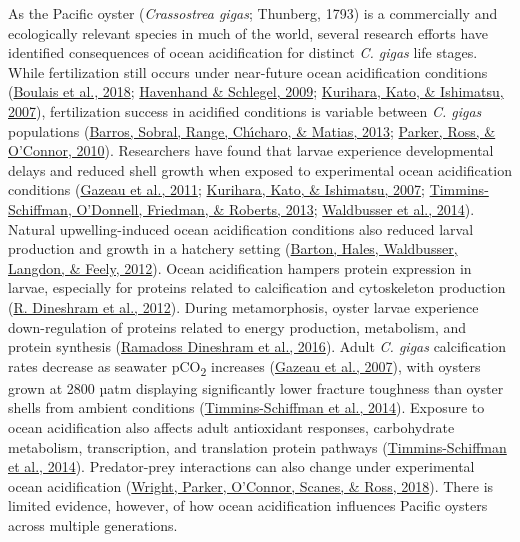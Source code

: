 \documentclass [11pt, proquest] {uwthesis}[2015/03/03]
\begin{document}
As the Pacific oyster (\emph{Crassostrea gigas}; Thunberg, 1793) is a commercially and ecologically relevant species in much of the world, several research efforts have identified consequences of ocean acidification for distinct \emph{C. gigas} life stages. While fertilization still occurs under near-future ocean acidification conditions (\protect\hyperlink{ref-Boulais2018}{Boulais et al., 2018}; \protect\hyperlink{ref-Havenhand2009}{Havenhand \& Schlegel, 2009}; \protect\hyperlink{ref-Kurihara2007}{Kurihara, Kato, \& Ishimatsu, 2007}), fertilization success in acidified conditions is variable between \emph{C. gigas} populations (\protect\hyperlink{ref-Barros2013}{Barros, Sobral, Range, Chı́charo, \& Matias, 2013}; \protect\hyperlink{ref-Parker2010}{Parker, Ross, \& O'Connor, 2010}). Researchers have found that larvae experience developmental delays and reduced shell growth when exposed to experimental ocean acidification conditions (\protect\hyperlink{ref-Gazeau2011}{Gazeau et al., 2011}; \protect\hyperlink{ref-Kurihara2007}{Kurihara, Kato, \& Ishimatsu, 2007}; \protect\hyperlink{ref-Timmins-Schiffman2013}{Timmins-Schiffman, O'Donnell, Friedman, \& Roberts, 2013}; \protect\hyperlink{ref-Waldbusser2014}{Waldbusser et al., 2014}). Natural upwelling-induced ocean acidification conditions also reduced larval production and growth in a hatchery setting (\protect\hyperlink{ref-Barton2012}{Barton, Hales, Waldbusser, Langdon, \& Feely, 2012}). Ocean acidification hampers protein expression in larvae, especially for proteins related to calcification and cytoskeleton production (\protect\hyperlink{ref-Dineshram2012}{R. Dineshram et al., 2012}). During metamorphosis, oyster larvae experience down-regulation of proteins related to energy production, metabolism, and protein synthesis (\protect\hyperlink{ref-Dineshram2016}{Ramadoss Dineshram et al., 2016}). Adult \emph{C. gigas} calcification rates decrease as seawater pCO\textsubscript{2} increases (\protect\hyperlink{ref-Gazeau2007}{Gazeau et al., 2007}), with oysters grown at 2800 µatm displaying significantly lower fracture toughness than oyster shells from ambient conditions (\protect\hyperlink{ref-Timmins-Schiffman2014}{Timmins-Schiffman et al., 2014}). Exposure to ocean acidification also affects adult antioxidant responses, carbohydrate metabolism, transcription, and translation protein pathways (\protect\hyperlink{ref-Timmins-Schiffman2014}{Timmins-Schiffman et al., 2014}). Predator-prey interactions can also change under experimental ocean acidification (\protect\hyperlink{ref-Wright2018}{Wright, Parker, O'Connor, Scanes, \& Ross, 2018}). There is limited evidence, however, of how ocean acidification influences Pacific oysters across multiple generations.
\end{document}

